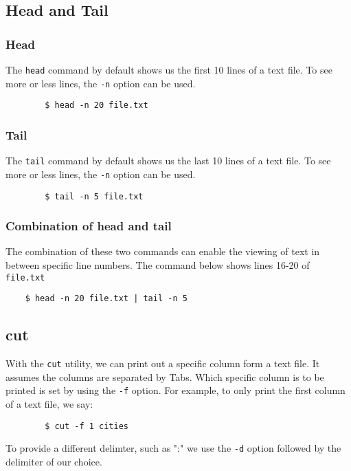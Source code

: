 \documentclass{report}
\begin{document}
	\subsection{Head and Tail}
	\subsubsection{Head}
	The \verb|head| command by default shows us the first 10 lines of a text file. To see more or less lines, the \verb|-n| option can be used.
	
	\begin{verbatim}
		$ head -n 20 file.txt
	\end{verbatim}
	
	\subsubsection{Tail}
	The \verb|tail| command by default shows us the last 10 lines of a text file. To see more or less lines, the \verb|-n| option can be used.
	
	\begin{verbatim}
		$ tail -n 5 file.txt
	\end{verbatim}
	
	\subsubsection{Combination of head and tail}
	The combination of these two commands can enable the viewing of text in between specific line numbers. The command below shows lines 16-20 of \texttt{file.txt}
	
	\begin{verbatim}
	$ head -n 20 file.txt | tail -n 5
	\end{verbatim}
	
	\subsection{cut}
	With the \verb|cut| utility, we can print out a specific column form a text file. It assumes the columns are separated by Tabs. Which specific column is to be printed is set by using the \verb|-f| option. For example, to only print the first column of a text file, we say:
	
	\begin{verbatim}
		$ cut -f 1 cities
	\end{verbatim}
	
	\noindent
	To provide a different delimter, such as ":" we use the \verb|-d| option followed by the delimiter of our choice. 
	
\end{document}
